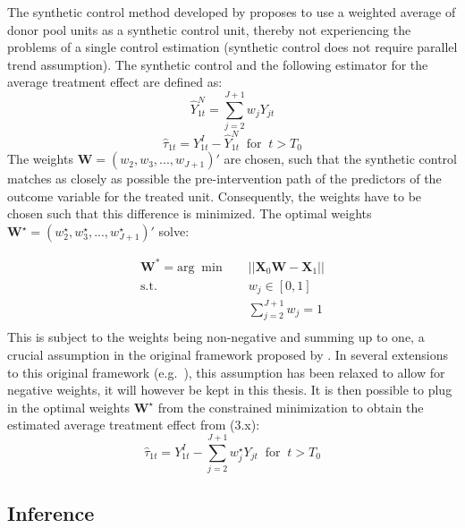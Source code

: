 \documentclass{scrbook}
\begin{document}
The synthetic control method developed by
\textcite{abadie_economic_2003} proposes to use a weighted average of
donor pool units as a synthetic control unit, thereby not experiencing
the problems of a single control estimation (synthetic control does not
require parallel trend assumption). The synthetic control and the
following estimator for the average treatment effect are defined as:
\begin{equation}
\hat{Y}_{1t}^{N}=\sum_{j=2}^{J+1} w_{j}Y_{jt}
\end{equation} \begin{equation}
\hat{\tau}_{1t}=Y_{1t}^{I}-\hat{Y}_{1t}^{N}\; \; \text{for}\; \; t>T_{0}
\end{equation} The weights \(\mathbf{W}=(w_{2},w_{3},...,w_{J+1})'\) are
chosen, such that the synthetic control matches as closely as possible
the pre-intervention path of the predictors of the outcome variable for
the treated unit. Consequently, the weights have to be chosen such that
this difference is minimized. The optimal weights
\(\mathbf{W}^{\star}=(w_{2}^{\star},w_{3}^{\star},...,w_{J+1}^{\star})'\)
solve:

\begin{equation}   
\begin{aligned}
\mathbf{W}^{*}=\text{arg}\; \min \quad & \vert\vert\mathbf{X}_{0}\mathbf{W}-\mathbf{X}_{1}\vert\vert\\
\textrm{s.t.} \quad & w_{j}\in[0,1]\\
  &\sum_{j=2}^{J+1} w_{j}=1   \\
\end{aligned}
\end{equation} This is subject to the weights being non-negative and
summing up to one, a crucial assumption in the original framework
proposed by \textcite{abadie_economic_2003}. In several extensions to
this original framework (e.g.~\textcite{doudchenko_balancing_2016}),
this assumption has been relaxed to allow for negative weights, it will
however be kept in this thesis. It is then possible to plug in the
optimal weights \(\mathbf{W}^{\star}\) from the constrained minimization
to obtain the estimated average treatment effect from (3.x):
\begin{equation}
\hat{\tau}_{1t}=Y_{1t}^{I}-\sum_{j=2}^{J+1} w_{j}^{\star}Y_{jt}\; \; \text{for}\; \; t>T_{0}
\end{equation}

\subsection*{Inference}
\end{document}
